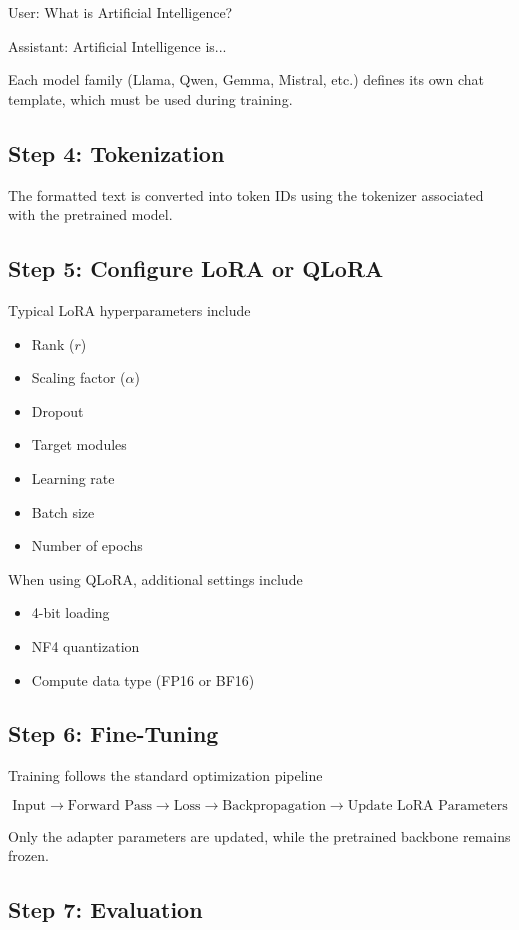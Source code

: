 User:
What is Artificial Intelligence?

Assistant:
Artificial Intelligence is...

Each model family (Llama, Qwen, Gemma, Mistral, etc.) defines its own chat template, which must be used during training.
\subsection*{Step 4: Tokenization}

The formatted text is converted into token IDs using the tokenizer associated with the pretrained model.
\subsection*{Step 5: Configure LoRA or QLoRA}

Typical LoRA hyperparameters include

\begin{itemize}
\item Rank ($r$)
\item Scaling factor ($\alpha$)
\item Dropout
\item Target modules
\item Learning rate
\item Batch size
\item Number of epochs
\end{itemize}

When using QLoRA, additional settings include

\begin{itemize}
\item 4-bit loading
\item NF4 quantization
\item Compute data type (FP16 or BF16)
\end{itemize}
\subsection*{Step 6: Fine-Tuning}

Training follows the standard optimization pipeline

\[
\text{Input}
\rightarrow
\text{Forward Pass}
\rightarrow
\text{Loss}
\rightarrow
\text{Backpropagation}
\rightarrow
\text{Update LoRA Parameters}
\]

Only the adapter parameters are updated, while the pretrained backbone remains frozen.
\subsection*{Step 7: Evaluation}

